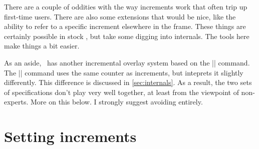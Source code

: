 \documentclass[a4paper]{ltxdoc}
\begin{document}
There are a couple of oddities with the way increments work that often trip up
first-time users.  There are also some extensions that would be nice, like the
ability to refer to a specific increment elsewhere in the frame.  These things
are certainly possible in stock \beamer, but take some digging into internals.
The tools here make things a bit easier.

As an aside, \beamer\ has another incremental overlay system based on the
|\pause| command.  The |\pause| command uses the same counter as increments, but
inteprets it slightly differently. This difference is discussed in 
\cref{sec:internals}. As a result, the two sets of specifications don't play very
well together, at least from the viewpoint of non-experts.  More on this below.
I strongly suggest avoiding  entirely.


\section{Setting increments}\label{sec:setting}
\end{document}
